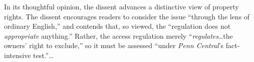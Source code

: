 %
%



In its thoughtful opinion, the dissent advances a distinctive view of property
rights. The dissent encourages readers to consider the issue ``through the lens
of ordinary English,'' and contends that, so viewed, the ``regulation does not
\textit{appropriate} anything.'' Rather, the access regulation merely
``\textit{regulates}\ldots the owners' right to exclude,'' so it must be
assessed ``under \textit{Penn Central}'s fact-intensive test.''\ldots


